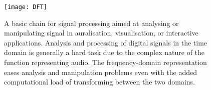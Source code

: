 \begin{figure}[htb]
    \centering
    \texttt{[image: DFT]}
    \caption[Basic signal processing chains]{A basic chain for signal processing aimed at analysing or manipulating signal in auralisation, visualisation, or interactive applications. Analysis and processing of digital signals in the time domain is generally a hard task due to the complex nature of the function representing audio. The frequency-domain representation eases analysis and manipulation problems even with the added computational load of transforming between the two domains.}
    \label{fig:DFT}
\end{figure}


